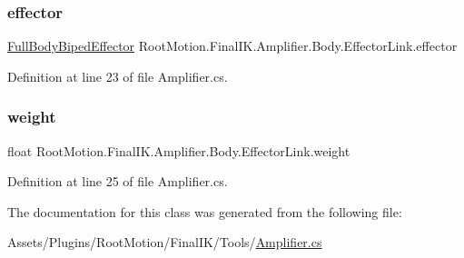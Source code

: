 \subsubsection{\texorpdfstring{effector}{effector}}
{\footnotesize\ttfamily \mbox{\hyperlink{namespace_root_motion_1_1_final_i_k_ae0dd2058c7667b6f132c11a6b860c14a}{Full\+Body\+Biped\+Effector}} Root\+Motion.\+Final\+I\+K.\+Amplifier.\+Body.\+Effector\+Link.\+effector}



Definition at line 23 of file Amplifier.\+cs.

\mbox{\label{class_root_motion_1_1_final_i_k_1_1_amplifier_1_1_body_1_1_effector_link_af879e467ede02f43f1b8abb2367a8bc2}} 
\subsubsection{\texorpdfstring{weight}{weight}}
{\footnotesize\ttfamily float Root\+Motion.\+Final\+I\+K.\+Amplifier.\+Body.\+Effector\+Link.\+weight}



Definition at line 25 of file Amplifier.\+cs.



The documentation for this class was generated from the following file\+:\begin{DoxyCompactItemize}
\item 
Assets/\+Plugins/\+Root\+Motion/\+Final\+I\+K/\+Tools/\mbox{\hyperlink{_amplifier_8cs}{Amplifier.\+cs}}\end{DoxyCompactItemize}
